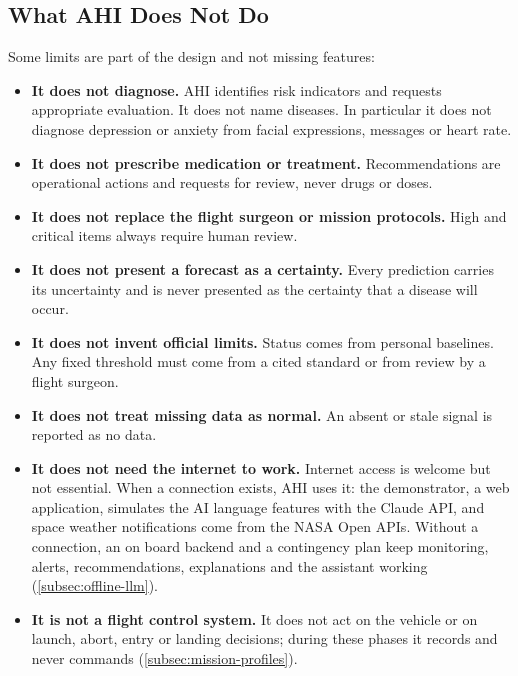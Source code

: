 \subsection{What AHI Does Not Do}
\label{subsec:not-in-scope}

Some limits are part of the design and not missing features:

\begin{itemize}
\item \textbf{It does not diagnose.} AHI identifies risk indicators and requests appropriate evaluation. It does not name diseases. In particular it does not diagnose depression or anxiety from facial expressions, messages or heart rate.
\item \textbf{It does not prescribe medication or treatment.} Recommendations are operational actions and requests for review, never drugs or doses.
\item \textbf{It does not replace the flight surgeon or mission protocols.} High and critical items always require human review.
\item \textbf{It does not present a forecast as a certainty.} Every prediction carries its uncertainty and is never presented as the certainty that a disease will occur.
\item \textbf{It does not invent official limits.} Status comes from personal baselines. Any fixed threshold must come from a cited standard or from review by a flight surgeon.
\item \textbf{It does not treat missing data as normal.} An absent or stale signal is reported as no data.
\item \textbf{It does not need the internet to work.} Internet access is welcome but not essential. When a connection exists, AHI uses it: the demonstrator, a web application, simulates the AI language features with the Claude API, and space weather notifications come from the NASA Open APIs. Without a connection, an on board backend and a contingency plan keep monitoring, alerts, recommendations, explanations and the assistant working (\ref{subsec:offline-llm}).
\item \textbf{It is not a flight control system.} It does not act on the vehicle or on launch, abort, entry or landing decisions; during these phases it records and never commands (\ref{subsec:mission-profiles}).
\end{itemize}

